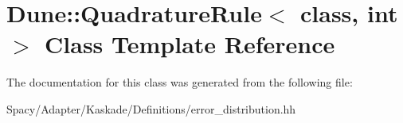 \hypertarget{classDune_1_1QuadratureRule}{}\section{Dune\+:\+:Quadrature\+Rule$<$ class, int $>$ Class Template Reference}
\label{classDune_1_1QuadratureRule}


The documentation for this class was generated from the following file\+:\begin{DoxyCompactItemize}
\item 
Spacy/\+Adapter/\+Kaskade/\+Definitions/error\+\_\+distribution.\+hh\end{DoxyCompactItemize}

